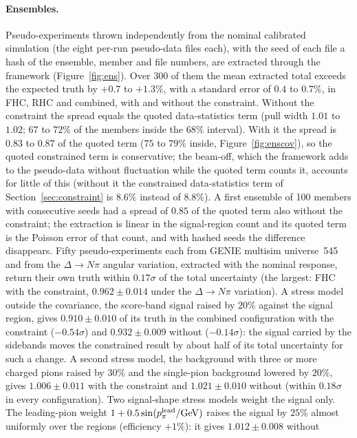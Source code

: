 \documentclass[11pt,a4paper]{article}
\begin{document}
\paragraph{Ensembles.} Pseudo-experiments thrown independently from the nominal calibrated simulation (the eight
per-run pseudo-data files each), with the seed of each file a hash of the ensemble, member and file numbers, are
extracted through the framework (Figure~\ref{fig:ens}). Over 300 of them the mean extracted total exceeds the
expected truth by $+0.7$ to $+1.3\%$, with a standard error of $0.4$ to $0.7\%$, in FHC, RHC and combined, with
and without the constraint. Without the constraint the spread equals the quoted data-statistics term (pull width
$1.01$ to $1.02$; $67$ to $72\%$ of the members inside the $68\%$ interval). With it the spread is $0.83$ to $0.87$
of the quoted term ($75$ to $79\%$ inside, Figure~\ref{fig:enscov}), so the quoted constrained term is conservative; the beam-off, which the
framework adds to the pseudo-data without fluctuation while the quoted term counts it, accounts for little of this
(without it the constrained data-statistics term of Section~\ref{sec:constraint} is $8.6\%$ instead of $8.8\%$).
A first ensemble of 100 members with consecutive seeds had a spread of $0.85$ of the quoted term also without the
constraint; the extraction is linear in the signal-region count and its quoted term is the Poisson error of that
count, and with hashed seeds the difference disappears. Fifty pseudo-experiments each from GENIE multisim
universe~545 and from the $\Delta\to N\pi$ angular variation, extracted with the nominal response, return their
own truth within $0.17\sigma$ of the total uncertainty (the largest: FHC with the constraint, $0.962\pm0.014$ under
the $\Delta\to N\pi$ variation). A stress model outside the covariance, the score-band signal raised by $20\%$
against the signal region, gives $0.910\pm0.010$ of its truth in the combined configuration with the constraint
($-0.54\sigma$) and $0.932\pm0.009$ without ($-0.14\sigma$): the signal carried by the sidebands moves the
constrained result by about half of its total uncertainty for such a change. A second stress model, the background
with three or more charged pions raised by $30\%$ and the single-pion background lowered by $20\%$, gives
$1.006\pm0.011$ with the constraint and $1.021\pm0.010$ without (within $0.18\sigma$ in every configuration). Two
signal-shape stress models weight the signal only. The leading-pion weight $1+0.5\sin(p_\pi^{\rm lead}/\mathrm{GeV})$
raises the signal by $25\%$ almost uniformly over the regions (efficiency $+1\%$): it gives $1.012\pm0.008$ without
\end{document}
